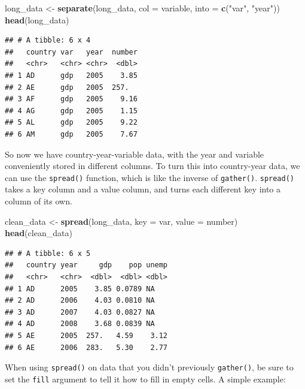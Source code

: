 \documentclass[
  12pt,
  oneside,openany]{book}
\newenvironment{Shaded}{\begin{snugshade}}{\end{snugshade}}
\newcommand{\DataTypeTok}[1]{\textcolor[rgb]{0.13,0.29,0.53}{#1}}
\newcommand{\KeywordTok}[1]{\textcolor[rgb]{0.13,0.29,0.53}{\textbf{#1}}}
\newcommand{\NormalTok}[1]{#1}
\newcommand{\StringTok}[1]{\textcolor[rgb]{0.31,0.60,0.02}{#1}}
\begin{document}
\begin{Shaded}
\begin{Highlighting}[]
\NormalTok{long\_data <{-}}\StringTok{ }\KeywordTok{separate}\NormalTok{(long\_data,}
                      \DataTypeTok{col =}\NormalTok{ variable,}
                      \DataTypeTok{into =} \KeywordTok{c}\NormalTok{(}\StringTok{"var"}\NormalTok{, }\StringTok{"year"}\NormalTok{))}
\KeywordTok{head}\NormalTok{(long\_data)}
\end{Highlighting}
\end{Shaded}

\begin{verbatim}
## # A tibble: 6 x 4
##   country var   year  number
##   <chr>   <chr> <chr>  <dbl>
## 1 AD      gdp   2005    3.85
## 2 AE      gdp   2005  257.  
## 3 AF      gdp   2005    9.16
## 4 AG      gdp   2005    1.15
## 5 AL      gdp   2005    9.22
## 6 AM      gdp   2005    7.67
\end{verbatim}

So now we have country-year-variable data, with the year and variable conveniently stored in different columns. To turn this into country-year data, we can use the \texttt{spread()} function, which is like the inverse of \texttt{gather()}. \texttt{spread()} takes a key column and a value column, and turns each different key into a column of its own.

\begin{Shaded}
\begin{Highlighting}[]
\NormalTok{clean\_data <{-}}\StringTok{ }\KeywordTok{spread}\NormalTok{(long\_data,}
                     \DataTypeTok{key =}\NormalTok{ var,}
                     \DataTypeTok{value =}\NormalTok{ number)}
\KeywordTok{head}\NormalTok{(clean\_data)}
\end{Highlighting}
\end{Shaded}

\begin{verbatim}
## # A tibble: 6 x 5
##   country year     gdp    pop unemp
##   <chr>   <chr>  <dbl>  <dbl> <dbl>
## 1 AD      2005    3.85 0.0789 NA   
## 2 AD      2006    4.03 0.0810 NA   
## 3 AD      2007    4.03 0.0827 NA   
## 4 AD      2008    3.68 0.0839 NA   
## 5 AE      2005  257.   4.59    3.12
## 6 AE      2006  283.   5.30    2.77
\end{verbatim}

When using \texttt{spread()} on data that you didn't previously \texttt{gather()}, be sure to set the \texttt{fill} argument to tell it how to fill in empty cells. A simple example:
\end{document}
